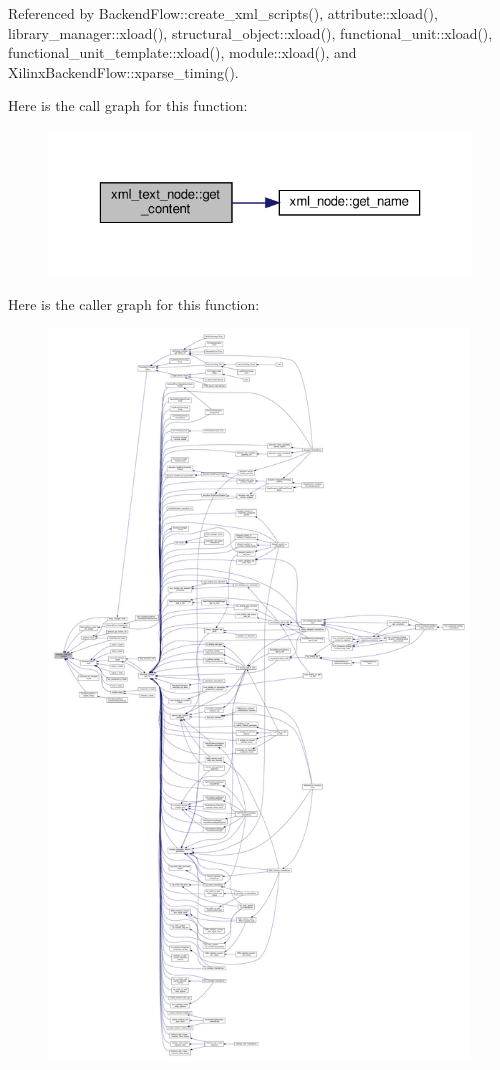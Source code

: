 Referenced by Backend\+Flow\+::create\+\_\+xml\+\_\+scripts(), attribute\+::xload(), library\+\_\+manager\+::xload(), structural\+\_\+object\+::xload(), functional\+\_\+unit\+::xload(), functional\+\_\+unit\+\_\+template\+::xload(), module\+::xload(), and Xilinx\+Backend\+Flow\+::xparse\+\_\+timing().

Here is the call graph for this function\+:
\nopagebreak
\begin{figure}[H]
\begin{center}
\leavevmode
\includegraphics[width=323pt]{dc/de6/classxml__text__node_afe0c3ab92ada3c4d6326c3150aefaf92_cgraph}
\end{center}
\end{figure}
Here is the caller graph for this function\+:
\nopagebreak
\begin{figure}[H]
\begin{center}
\leavevmode
\includegraphics[height=550pt]{dc/de6/classxml__text__node_afe0c3ab92ada3c4d6326c3150aefaf92_icgraph}
\end{center}
\end{figure}
